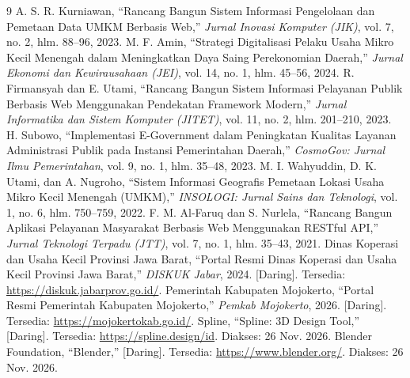 \documentclass[conference]{IEEEtran}
\begin{document}
\begin{thebibliography}{9}
 A. S. R. Kurniawan, ``Rancang Bangun Sistem Informasi Pengelolaan dan Pemetaan Data UMKM Berbasis Web,'' \textit{Jurnal Inovasi Komputer (JIK)}, vol. 7, no. 2, hlm. 88--96, 2023.
 M. F. Amin, ``Strategi Digitalisasi Pelaku Usaha Mikro Kecil Menengah dalam Meningkatkan Daya Saing Perekonomian Daerah,'' \textit{Jurnal Ekonomi dan Kewirausahaan (JEI)}, vol. 14, no. 1, hlm. 45--56, 2024.
 R. Firmansyah dan E. Utami, ``Rancang Bangun Sistem Informasi Pelayanan Publik Berbasis Web Menggunakan Pendekatan Framework Modern,'' \textit{Jurnal Informatika dan Sistem Komputer (JITET)}, vol. 11, no. 2, hlm. 201--210, 2023.
 H. Subowo, ``Implementasi E-Government dalam Peningkatan Kualitas Layanan Administrasi Publik pada Instansi Pemerintahan Daerah,'' \textit{CosmoGov: Jurnal Ilmu Pemerintahan}, vol. 9, no. 1, hlm. 35--48, 2023.
 M. I. Wahyuddin, D. K. Utami, dan A. Nugroho, ``Sistem Informasi Geografis Pemetaan Lokasi Usaha Mikro Kecil Menengah (UMKM),'' \textit{INSOLOGI: Jurnal Sains dan Teknologi}, vol. 1, no. 6, hlm. 750--759, 2022.
 F. M. Al-Faruq dan S. Nurlela, ``Rancang Bangun Aplikasi Pelayanan Masyarakat Berbasis Web Menggunakan RESTful API,'' \textit{Jurnal Teknologi Terpadu (JTT)}, vol. 7, no. 1, hlm. 35--43, 2021.
 Dinas Koperasi dan Usaha Kecil Provinsi Jawa Barat, ``Portal Resmi Dinas Koperasi dan Usaha Kecil Provinsi Jawa Barat,'' \textit{DISKUK Jabar}, 2024. [Daring]. Tersedia: \url{https://diskuk.jabarprov.go.id/}.
 Pemerintah Kabupaten Mojokerto, ``Portal Resmi Pemerintah Kabupaten Mojokerto,'' \textit{Pemkab Mojokerto}, 2026. [Daring]. Tersedia: \url{https://mojokertokab.go.id/}.
 Spline, ``Spline: 3D Design Tool,'' [Daring]. Tersedia: \url{https://spline.design/id}. Diakses: 26 Nov. 2026.
 Blender Foundation, ``Blender,'' [Daring]. Tersedia: \url{https://www.blender.org/}. Diakses: 26 Nov. 2026.
\end{thebibliography}
\end{document}
